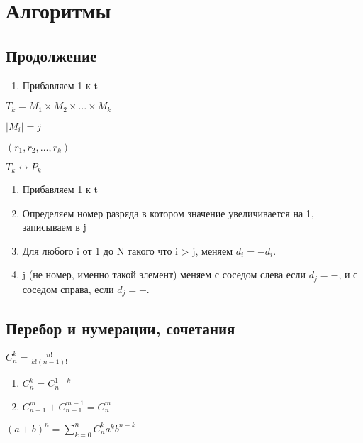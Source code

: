 



\chapter{Алгоритмы}


\section{Продолжение}


\begin{enumerate}
    \item Прибавляем 1 к t
\end{enumerate}


$T_k = M_1 \times M_2 \times \dots \times M_k$

$|M_i| = j$

$(r_1, r_2, \dots, r_k)$

$T_k \leftrightarrow P_k$


\begin{enumerate}
    \item Прибавляем 1 к t
    \item Определяем номер разряда в котором значение увеличивается на 1, записываем в j
    \item Для любого i от 1 до N такого что i > j, меняем $d_i = -d_i$.
    \item j (не номер, именно такой элемент) меняем с соседом слева если $d_j=-$, и с соседом справа, если $d_j = +$.
\end{enumerate}


\section{Перебор и нумерации, сочетания}


$C_n^k = \frac{n!}{k!(n-1)!}$

\begin{enumerate}
    \item $C_n^k = C_n^{1-k}$
    \item $C_{n-1}^m + C_{n-1}^{m-1} = C_n^m$ 
\end{enumerate}


$(a + b)^n = \sum_{k = 0}^{n}C_n^k a^k b^{n-k}$


